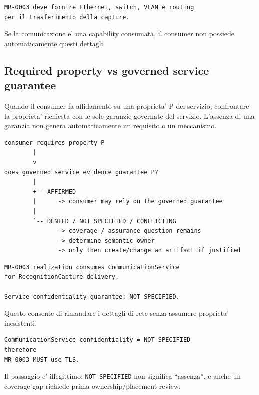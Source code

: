 \documentclass[11pt,a4paper]{article}
\newcommand{\code}[1]{\texttt{#1}}
\begin{document}
\begin{badbox}
\begin{lstlisting}
MR-0003 deve fornire Ethernet, switch, VLAN e routing
per il trasferimento della capture.
\end{lstlisting}
Se la comunicazione e' una capability consumata, il consumer non possiede automaticamente questi dettagli.
\end{badbox}

\subsection{Required property vs governed service guarantee}

\begin{statusworking}
Quando il consumer fa affidamento su una proprieta' P del servizio, confrontare la proprieta' richiesta con le sole garanzie governate del servizio. L'assenza di una garanzia non genera automaticamente un requisito o un meccanismo.
\end{statusworking}

\begin{lstlisting}
consumer requires property P
        |
        v
does governed service evidence guarantee P?
        |
        +-- AFFIRMED
        |      -> consumer may rely on the governed guarantee
        |
        `-- DENIED / NOT SPECIFIED / CONFLICTING
               -> coverage / assurance question remains
               -> determine semantic owner
               -> only then create/change an artifact if justified
\end{lstlisting}

\begin{goodbox}
\begin{lstlisting}
MR-0003 realization consumes CommunicationService
for RecognitionCapture delivery.

Service confidentiality guarantee: NOT SPECIFIED.
\end{lstlisting}
Questo consente di rimandare i dettagli di rete senza assumere proprieta' inesistenti.
\end{goodbox}

\begin{badbox}
\begin{lstlisting}
CommunicationService confidentiality = NOT SPECIFIED
therefore
MR-0003 MUST use TLS.
\end{lstlisting}
Il passaggio e' illegittimo: \code{NOT SPECIFIED} non significa ``assenza'', e anche un coverage gap richiede prima ownership/placement review.
\end{badbox}
\end{document}
